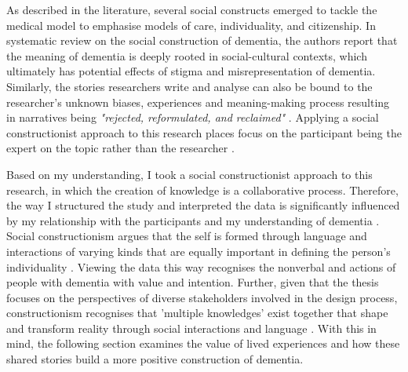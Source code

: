 As described in the literature, several social constructs emerged to tackle the medical model to emphasise models of care, individuality, and citizenship. In \cite{bosco2019social} systematic review on the social construction of dementia, the authors report that the meaning of dementia is deeply rooted in social-cultural contexts, which ultimately has potential effects of stigma and misrepresentation of dementia. Similarly, the stories researchers write and analyse can also be bound to the researcher's unknown biases, experiences and meaning-making process resulting in narratives being \textit{"rejected, reformulated, and reclaimed"} \citep[pg.850]{mcgovern2014forgotten}. Applying a social constructionist approach to this research places focus on the participant being the expert on the topic rather than the researcher \citep{padgett2016qualitative}.

Based on my understanding, I took a social constructionist approach to this research, in which the creation of knowledge is a collaborative process. Therefore, the way I structured the study and interpreted the data is significantly influenced by my relationship with the participants and my understanding of dementia \citep{surr2006preservation}. Social constructionism argues that the self is formed through language and interactions of varying kinds that are equally important in defining the person's individuality \citep{sarup1996identity}. Viewing the data this way recognises the nonverbal and actions of people with dementia with value and intention. Further, given that the thesis focuses on the perspectives of diverse stakeholders involved in the design process, constructionism recognises that 'multiple knowledges' exist together that shape and transform reality through social interactions and language \citep{mckeown2015you}. With this in mind, the following section examines the value of lived experiences and how these shared stories build a more positive construction of dementia.

